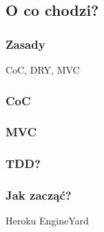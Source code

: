 \subsection{O co chodzi?}
\begin{frame}[fragile]
\frametitle{Zasady}
CoC, DRY, MVC
\end{frame}

\begin{frame}[fragile]
\frametitle{CoC}
\end{frame}

\begin{frame}[fragile]
\frametitle{MVC}
\end{frame}

\begin{frame}[fragile]
\frametitle{TDD?}
\end{frame}

\begin{frame}[fragile]
\frametitle{Jak zacząć?}

Heroku 
EngineYard
\end{frame}

